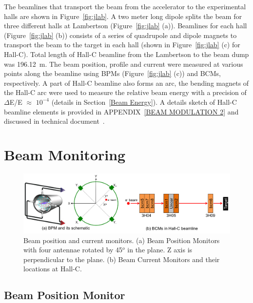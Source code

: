 The beamlines that transport the beam from the accelerator to the experimental halls are shown in Figure~\ref{fig:jlab}. A two meter long dipole splits the beam for three different halls at Lambertson (Figure~\ref{fig:jlab} (a)). Beamlines for each hall (Figure~\ref{fig:jlab} (b)) consists of a series of quadrupole and dipole magnets to transport the beam to the target in each hall (shown in Figure~\ref{fig:jlab} (c) for Hall-C). Total length of Hall-C beamline from the Lambertson to the beam dump was 196.12~m.
The beam position, profile and current were measured at various points along the beamline using BPMs (Figure~\ref{fig:jlab} (c)) and BCMs, respectively. A part of Hall-C beamline also forms an arc, the bending magnets of the Hall-C arc were used to measure the relative beam energy with a precision of $\Delta$E/E $\approx$ $10^{-4}$ (details in Section~\ref{Beam Energy}).
A details sketch of Hall-C beamline elements is provided in APPENDIX~\ref{BEAM MODULATION 2} and discussed in technical document~\cite{nur_beamline_sketch}.

\section{Beam Monitoring}%
\label{Beam Monitoring}

\begin{singlespace}
\begin{figure}[!h]
	\begin{center}
	\includegraphics[width=15.0cm]{figures/beam_monitor}
	\end{center}
	\caption
	{Beam position and current monitors. (a) Beam Position Monitors with four antennae rotated by 45$^o$ in the plane. Z axis is perpendicular to the plane. (b) Beam Current Monitors and their locations at Hall-C.}
	\label{fig:beam_monitor}
\end{figure}
\end{singlespace}

\subsection{Beam Position Monitor}%
\label{Beam Position Monitor}


